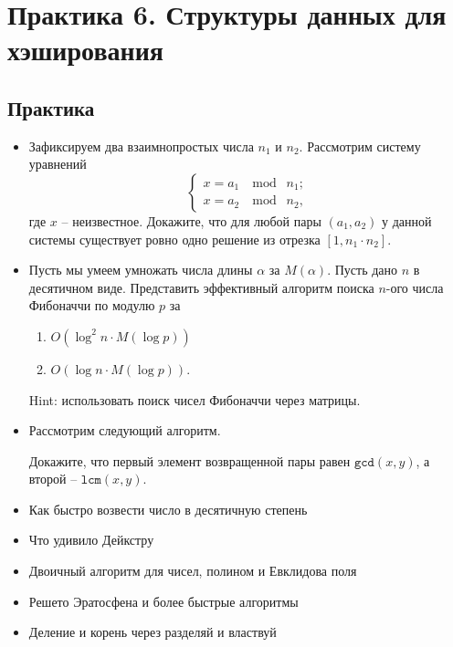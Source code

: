 \section{Практика 6. Структуры данных для хэширования}

\subsection{Практика}

\begin{itemize}

    \item Зафиксируем два взаимнопростых числа $n_1$ и $n_2$. Рассмотрим систему уравнений
            $$
            \left\{
                \begin{array}{l}
                    x = a_1 \;\mod\; n_1; \\
                    x = a_2 \;\mod\; n_2,
                \end{array}        
            \right.
            $$
            где $x$ -- неизвестное. Докажите, что для любой пары $(a_1, a_2)$ у данной системы существует ровно одно решение из отрезка $[1, n_1 \cdot n_2]$.
        
        
    \item Пусть мы умеем умножать числа длины $\alpha$ за $M(\alpha)$. Пусть дано $n$ в десятичном виде. Представить эффективный алгоритм поиска $n$-ого числа Фибоначчи по модулю $p$ за
    \begin{enumerate}
        \item $O(\log^2 n \cdot M(\log p))$
        \item $O(\log n \cdot M(\log p))$.
    \end{enumerate}
    Hint: использовать поиск чисел Фибоначчи через матрицы.

    \item Рассмотрим следующий алгоритм.
    
    Докажите, что первый элемент возвращенной пары равен $\texttt{gcd}(x, y)$, а второй -- $\texttt{lcm}(x, y)$.    

  \item Как быстро возвести число в десятичную степень
  \item Что удивило Дейкстру
  \item Двоичный алгоритм для чисел, полином и Евклидова поля
  \item Решето Эратосфена и более быстрые алгоритмы
  \item Деление и корень через разделяй и властвуй

\end{itemize}

